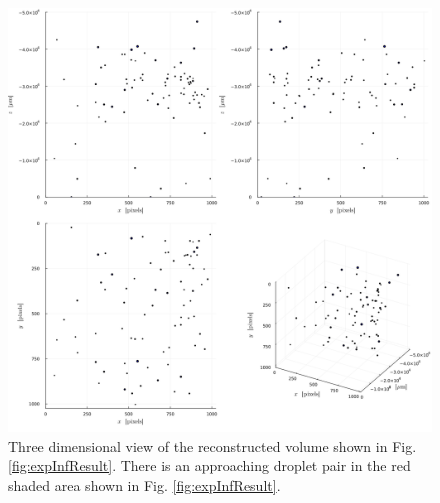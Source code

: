 \begin{figure}[H]
    \centering
    \includegraphics[width=0.98\linewidth]{./Figure/4_Results/exp/3dview.png}
    \caption{Three dimensional view of the reconstructed volume shown in Fig. \ref{fig:expInfResult}. There is an approaching droplet pair in the red shaded area shown in Fig. \ref{fig:expInfResult}.}
    \label{fig:3dview}
\end{figure}

